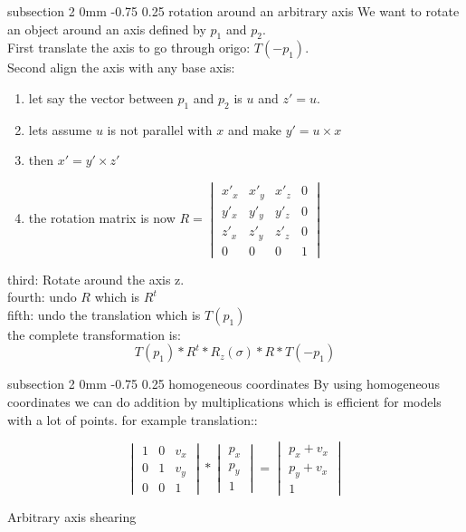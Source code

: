 \documentclass[a4paper,11pt]{article}
\makeatletter
\renewcommand{\subsection}{\@startsection
   {subsection}%
   {2}%
   {0mm}%
   {-0.75\baselineskip}%
   {0.25\baselineskip}%
   {\rmfamily\normalfont\slshape\normalsize}}%
\makeatother
\begin{document}
\subsection{rotation around an arbitrary axis}
We want to rotate an object around an axis defined by $p_1$ and $p_2$.
\\First translate the axis to go through origo: $T(-p_1)$.\\
Second align the axis with any base axis:\\
\begin{enumerate}
\item let say the vector between $p_1$ and $p_2$ is $u$ and $z'=u$.
\item lets assume $u$ is not parallel with $x$ and make $y'=u\times x$
\item then $x'=y'\times z'$
\item the rotation matrix is now $R= \begin{vmatrix} x'_x&x'_y&x'_z&0\\ y'_x&y'_y&y'_z&0\\z'_x&z'_y&z'_z&0\\0&0&0&1 \end{vmatrix}$
\end{enumerate}
third: Rotate around the axis z.\\
fourth: undo $R$ which is $R^t$\\
fifth: undo the translation which is $T(p_1)$\\
the complete transformation is:
$$T(p_1)*R^t*R_z(\sigma)*R*T(-p_1)$$

\subsection{homogeneous coordinates}
By using homogeneous coordinates we can do addition by multiplications which is efficient for models with a lot of points. for example translation::

\begin{table}[H]
$$ \begin{vmatrix} 1&0&v_x\\ 0&1&v_y\\0&0&1 \end{vmatrix}*\begin{vmatrix}p_x\\p_y\\1 \end{vmatrix}=\begin{vmatrix}p_x+v_x\\p_y+v_x\\1 \end{vmatrix}$$
  \caption{Arbitrary axis shearing}
\end{table}
\end{document}
